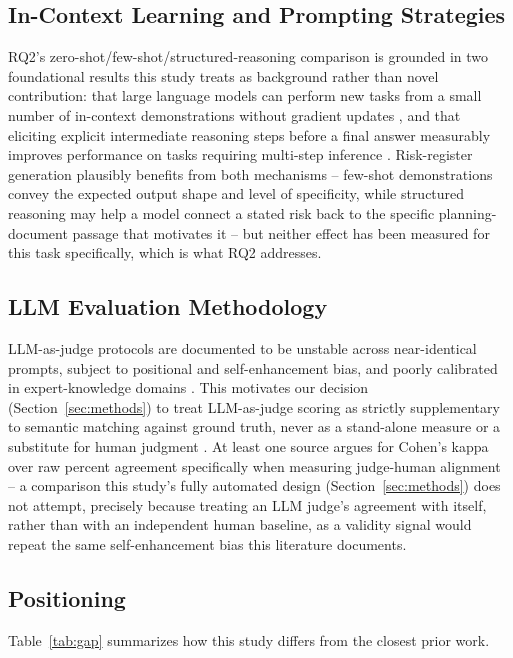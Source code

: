\documentclass[conference]{IEEEtran}
\begin{document}
\subsection{In-Context Learning and Prompting Strategies}
RQ2's zero-shot/few-shot/structured-reasoning comparison is grounded in two
foundational results this study treats as background rather than novel
contribution: that large language models can perform new tasks from a small
number of in-context demonstrations without gradient updates
\cite{brown2020fewshot}, and that eliciting explicit intermediate reasoning
steps before a final answer measurably improves performance on tasks
requiring multi-step inference \cite{wei2022cot}. Risk-register generation
plausibly benefits from both mechanisms -- few-shot demonstrations convey
the expected output shape and level of specificity, while structured
reasoning may help a model connect a stated risk back to the specific
planning-document passage that motivates it -- but neither effect has been
measured for this task specifically, which is what RQ2 addresses.

\subsection{LLM Evaluation Methodology}
LLM-as-judge protocols are documented to be unstable across near-identical
prompts, subject to positional and self-enhancement bias, and poorly
calibrated in expert-knowledge domains
\cite{zheng2023judging_llm_judge,iui2025llmjudge_expert,nofreelabels2025}.
This motivates our decision (Section~\ref{sec:methods}) to treat LLM-as-judge
scoring as strictly supplementary to semantic matching against ground
truth, never as a stand-alone measure or a substitute for human judgment
\cite{llmsasjudges2024survey}. At least one source argues for Cohen's kappa
over raw percent agreement specifically when measuring judge-human
alignment \cite{thakur2024kappa} -- a comparison this study's fully
automated design (Section~\ref{sec:methods}) does not attempt, precisely
because treating an LLM judge's agreement with itself, rather than with an
independent human baseline, as a validity signal would repeat the same
self-enhancement bias this literature documents.

\subsection{Positioning}
Table~\ref{tab:gap} summarizes how this study differs from the closest
prior work.
\end{document}
